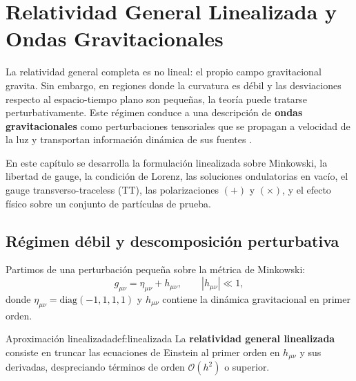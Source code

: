 
\chapter{Relatividad General Linealizada y Ondas Gravitacionales}
\label{cap:rg_linealizada_og}

La relatividad general completa es no lineal: el propio campo gravitacional gravita. Sin embargo, en regiones donde la curvatura es débil y las desviaciones respecto al espacio-tiempo plano son pequeñas, la teoría puede tratarse perturbativamente. Este régimen conduce a una descripción de \textbf{ondas gravitacionales} como perturbaciones tensoriales que se propagan a velocidad de la luz y transportan información dinámica de sus fuentes \cite{Misner1973, Wald1984, Carroll2004, Maggiore2007, Maggiore2018}.

En este capítulo se desarrolla la formulación linealizada sobre Minkowski, la libertad de gauge, la condición de Lorenz, las soluciones ondulatorias en vacío, el gauge transverso-traceless (TT), las polarizaciones $(+)$ y $(\times)$, y el efecto físico sobre un conjunto de partículas de prueba.

\section{Régimen débil y descomposición perturbativa}
\label{sec:regimen_debil}

Partimos de una perturbación pequeña sobre la métrica de Minkowski:
\begin{equation}
  g_{\mu\nu} = \eta_{\mu\nu} + h_{\mu\nu},
  \qquad
  |h_{\mu\nu}|\ll 1,
\end{equation}
donde $\eta_{\mu\nu}=\mathrm{diag}(-1,1,1,1)$ y $h_{\mu\nu}$ contiene la dinámica gravitacional en primer orden.

\begin{definicion}{Aproximación linealizada}{def:linealizada}
La \textbf{relatividad general linealizada} consiste en truncar las ecuaciones de Einstein al primer orden en $h_{\mu\nu}$ y sus derivadas, despreciando términos de orden $\mathcal{O}(h^2)$ o superior.
\end{definicion}

